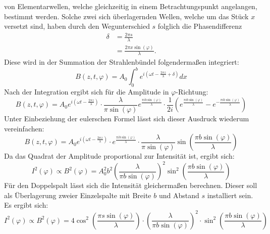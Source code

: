 von Elementarwellen, welche gleichzeitig in einem Betrachtungspunkt angelangen,
bestimmt werden. Solche zwei sich überlagernden Wellen, welche um das Stück $x$
versetzt sind, haben durch den Wegunterschied $s$ folglich die Phasendifferenz
\begin{align}
    \label{eqn:2}
    \delta &= \frac{2 \pi s}{\lambda} \\
    \label{eqn:3}
           &= \frac{2 \pi x \sin(\varphi)}{\lambda}.
\end{align}
\noindent Diese wird in der Summation der Strahlenbündel folgendermaßen integriert:
\begin{equation}
    \label{eqn:4}
    B(z,t,\varphi) = A_0 \int_0^b e^{i\left(\omega t - \frac{2 \pi z}{\lambda}
    + \delta\right)} dx
\end{equation}
\noindent Nach der Integration ergibt sich für die Amplitude in $\varphi$-Richtung:
\begin{equation}
    \label{eqn:5}
    B(z,t,\varphi) = A_0 e^{i\left(\omega t - \frac{2 \pi z}{\lambda}\right)}
    \cdot \frac{\lambda}{\pi \sin(\varphi)} e^{\frac{\pi i b \sin(\varphi)}{\lambda}}
    \cdot \frac{1}{2i} \left(e^{\frac{\pi i b \sin(\varphi)}{\lambda}}
    -e^{-\frac{\pi i b \sin(\varphi)}{\lambda}}\right)
\end{equation}
\noindent Unter Einbeziehung der eulerschen Formel lässt sich dieser Ausdruck
wiederum vereinfachen:
\begin{equation}
    \label{eqn:6}
    B(z,t,\varphi) = A_0 e^{i\left(\omega t - \frac{2 \pi z}{\lambda}\right)}
    \cdot e^{\frac{\pi i b \sin(\varphi)}{\lambda}} \cdot \frac{\lambda}{\pi \sin(\varphi)}
    \sin\left(\frac{\pi b \sin(\varphi)}{\lambda}\right)
\end{equation}
\noindent Da das Quadrat der Amplitude proportional zur Intensität ist, ergibt 
sich:
\begin{equation}
    \label{eqn:7}
    I^2 (\varphi) \propto B^2 (\varphi) = A_0^2 b^2 \left(\frac{\lambda}
    {\pi b \sin(\varphi)}\right)^2 \sin^2 \left(\frac{\pi b \sin(\varphi)}
    {\lambda}\right)
\end{equation}
Für den Doppelspalt lässt sich die Intensität gleichermaßen berechnen. Dieser 
soll als Überlagerung zweier Einzelspalte mit Breite $b$ und Abstand $s$ 
installiert sein. Es ergibt sich:
\begin{equation}
    \label{eqn:8}
    I^2 (\varphi) \propto B^2 (\varphi) = 4 \cos^2 \left(\frac{\pi s \sin(\varphi)}
    {\lambda}\right) \cdot \left(\frac{\lambda}{\pi b \sin(\varphi)}\right)^2
    \cdot \sin^2\left(\frac{\pi b \sin(\varphi)}{\lambda}\right)
\end{equation}

